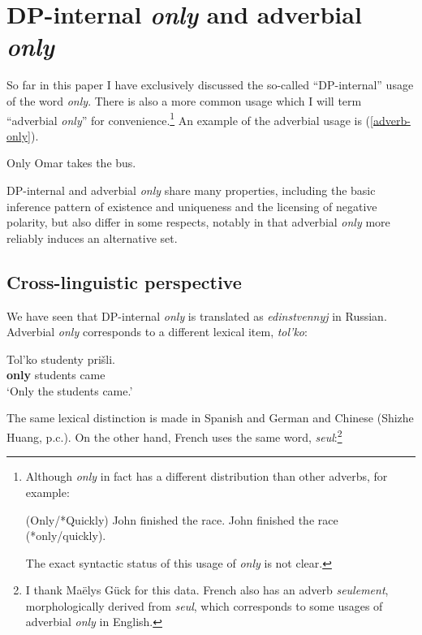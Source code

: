 \section{DP-internal \textit{only} and adverbial \textit{only} \label{sec:two-onlys}}
So far in this paper I have exclusively discussed the so-called ``DP-internal'' usage of the word \textit{only}. There is also a more common usage which I will term ``adverbial \textit{only}'' for convenience.\footnote{Although \textit{only} in fact has a different distribution than other adverbs, for example: \begin{exe} \ex (Only/*Quickly) John finished the race. \ex John finished the race (*only/quickly). \end{exe} The exact syntactic status of this usage of \textit{only} is not clear.} An example of the adverbial usage is (\ref{adverb-only}).

\begin{exe}
	\ex \label{adverb-only} Only Omar takes the bus.
\end{exe}

DP-internal and adverbial \textit{only} share many properties, including the basic inference pattern of existence and uniqueness and the licensing of negative polarity, but also differ in some respects, notably in that adverbial \textit{only} more reliably induces an alternative set.

\subsection{Cross-linguistic perspective}
We have seen that DP-internal \textit{only} is translated as \textit{edinstvennyj} in Russian. Adverbial \textit{only} corresponds to a different lexical item, \textit{tol'ko}:

\begin{exe}
	\ex \gll Tol'ko studenty pri\v{s}li.\\
	\textbf{only} students came\\
	\glt `Only the students came.'
\end{exe}

The same lexical distinction is made in Spanish and German \citep{mcnally08} and Chinese (Shizhe Huang, p.c.). On the other hand, French uses the same word, \textit{seul}:\footnote{I thank Ma\"{e}lys G\"{u}ck for this data. French also has an adverb \textit{seulement}, morphologically derived from \textit{seul}, which corresponds to some usages of adverbial \textit{only} in English.}

